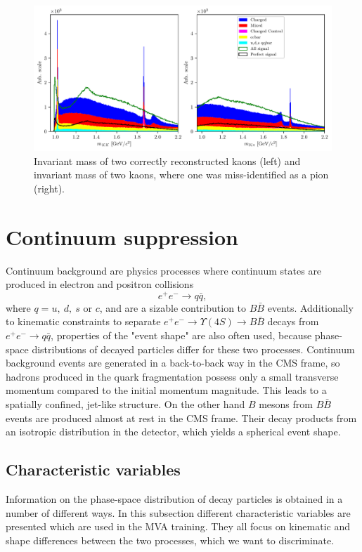 \documentclass[  headings=standardclasses,
  headings=big,oneside,a4paper,openany,12pt]{scrbook}
\begin{document}
\begin{figure}[H]
\centering
\captionsetup{width=0.8\linewidth}
\includegraphics[width=\linewidth]{fig/res_bkg}
\caption{Invariant mass of two correctly reconstructed kaons (left) and invariant mass of two kaons, where one was miss-identified as a pion (right).}
\label{fig:res_bkg}
\end{figure}


\section{Continuum suppression}

Continuum background are physics processes where continuum states are produced in electron and positron collisions $$e^+ e^- \to q \bar q,$$ 
where $q = u,~d,~s$ or $c$, and are a sizable contribution to $B \bar B$ events. Additionally to kinematic constraints to separate $e^+ e^- \to \Upsilon(4S) \to B \bar B$ decays from $e^+ e^- \to q \bar q$, properties of the "event shape" are also often used, because phase-space distributions of decayed particles differ for these two processes. Continuum background events are generated in a back-to-back way in the CMS frame, so hadrons produced in the quark fragmentation possess only a small transverse momentum compared to the initial momentum magnitude. This leads to a spatially confined, jet-like structure. On the other hand $B$ mesons from $B \bar B$ events are produced almost at rest in the CMS frame. Their decay products from an isotropic distribution in the detector, which yields a spherical event shape.

\subsection{Characteristic variables}
\label{ss:charvar}
Information on the phase-space distribution of decay particles is obtained in a number of different ways. In this subsection different characteristic variables are presented which are used in the MVA training. They all focus on kinematic and shape differences between the two processes, which we want to discriminate. 
\end{document}
